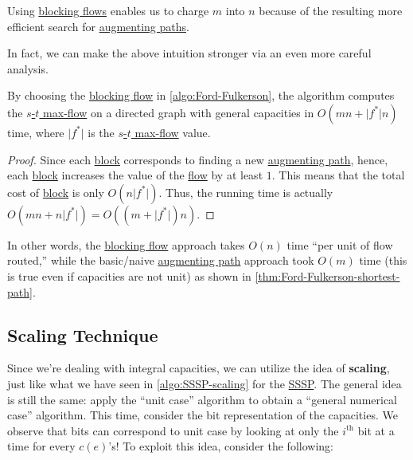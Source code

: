 \begin{intuition}
	Using \hyperref[def:blocking-flow]{blocking flows} enables us to charge \(m\) into \(n\) because of the resulting more efficient search for \hyperref[def:augmenting-path]{augmenting paths}.
\end{intuition}

In fact, we can make the above intuition stronger via an even more careful analysis.

\begin{corollary}\label{col:Ford-Fulkerson-blocking-flow-general}
	By choosing the \hyperref[def:blocking-flow]{blocking flow} in \autoref{algo:Ford-Fulkerson}, the algorithm computes the \hyperref[prb:s-t-max-flow]{\(s\)-\(t\) max-flow} on a directed graph with general capacities in \(O(mn + \lvert f^{\ast} \rvert n)\) time, where \(\lvert f^{\ast} \rvert \) is the \hyperref[prb:s-t-max-flow]{\(s\)-\(t\) max-flow} value.
\end{corollary}
\begin{proof}
	Since each \hyperref[algo:adaptive-DFS-block]{block} corresponds to finding a new \hyperref[def:augmenting-path]{augmenting path}, hence, each \hyperref[algo:adaptive-DFS-block]{block} increases the value of the \hyperref[def:flow]{flow} by at least \(1\). This means that the total cost of \hyperref[algo:adaptive-DFS-block]{block} is only \(O(n \lvert f^{\ast} \rvert )\). Thus, the running time is actually \(O(mn + n \lvert f^{\ast} \rvert ) = O((m + \lvert f^{\ast} \rvert) n)\).
\end{proof}

In other words, the \hyperref[def:blocking-flow]{blocking flow} approach takes \(O(n)\) time ``per unit of flow routed,'' while the basic/naive \hyperref[def:augmenting-path]{augmenting path} approach took \(O(m)\) time (this is true even if capacities are not unit) as shown in \autoref{thm:Ford-Fulkerson-shortest-path}.

\subsection{Scaling Technique}
Since we're dealing with integral capacities, we can utilize the idea of \textbf{scaling}, just like what we have seen in \autoref{algo:SSSP-scaling} for the \hyperref[prb:SSSP]{SSSP}. The general idea is still the same: apply the ``unit case'' algorithm to obtain a ``general numerical case'' algorithm. This time, consider the bit representation of the capacities. We observe that bits can correspond to unit case by looking at only the \(i^{\text{th} }\) bit at a time for every \(c(e)\)'s! To exploit this idea, consider the following:

